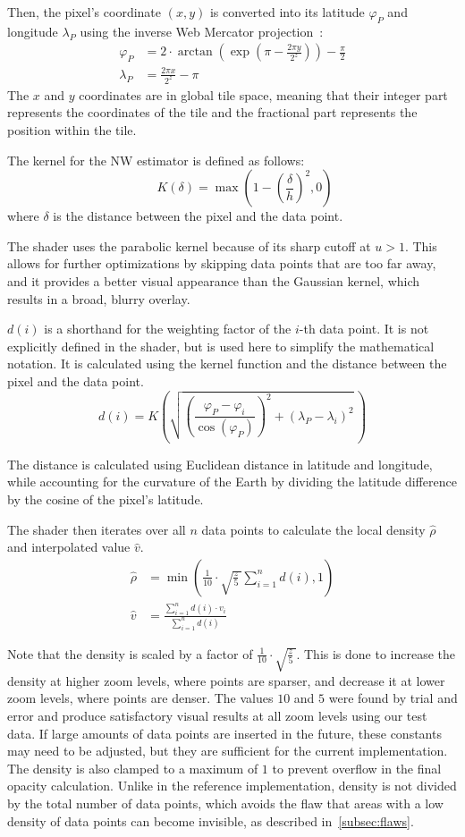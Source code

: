 Then, the pixel's coordinate $(x, y)$ is converted into its latitude $\varphi_{P}$ and longitude $\lambda_{P}$ using the inverse Web Mercator projection\ \cite{explorers:webmerc}:
\[
\begin{aligned}
\varphi_P &= 2 \cdot \arctan\left(\exp\left(\pi - \frac{2\pi y}{2^z}\right)\right) - \frac{\pi}{2}\\
\lambda_P &= \frac{2\pi x}{2^z} - \pi 
\end{aligned}
\]
The $x$ and $y$ coordinates are in global tile space, meaning that their integer part represents the coordinates of the tile and the fractional part represents the position within the tile.

The kernel for the NW estimator is defined as follows:
\[
\qquad K(\delta) = \max\left( 1-{\left( \frac{\delta}{h} \right)}^{2}, 0\right)
\]
where $\delta$ is the distance between the pixel and the data point.

The shader uses the parabolic kernel because of its sharp cutoff at $u > 1$. This allows for further optimizations by skipping data points that are too far away, and it provides a better visual appearance than the Gaussian kernel, which results in a broad, blurry overlay.

$d(i)$ is a shorthand for the weighting factor of the $i$-th data point. It is not explicitly defined in the shader, but is used here to simplify the mathematical notation. It is calculated using the kernel function and the distance between the pixel and the data point.
\[
d(i) = K\left(\sqrt{ {\left( \frac{\varphi_{P}-\varphi_{i}}{\cos(\varphi_{P})} \right)}^{2} + {(\lambda_{P}-\lambda_{i})}^{2}}\,\right)
\]

The distance is calculated using Euclidean distance in latitude and longitude, while accounting for the curvature of the Earth by dividing the latitude difference by the cosine of the pixel's latitude.

The shader then iterates over all $n$ data points to calculate the local density $\hat{\rho}$ and interpolated value $\hat{v}$.
\[
\begin{aligned}
\hat{\rho} &= \min\left(\frac{1}{10}\cdot\sqrt{ \frac{z}{5} \,}\sum_{i=1}^n d(i),1\right)\\
\hat{v} &= \frac{\sum_{i=1}^n d(i)\cdot v_{i}}{\sum_{i=1}^n d(i)}
\end{aligned}
\]

Note that the density is scaled by a factor of $\frac{1}{10}\cdot\sqrt{ \frac{z}{5} \,}$. This is done to increase the density at higher zoom levels, where points are sparser, and decrease it at lower zoom levels, where points are denser. The values $10$ and $5$ were found by trial and error and produce satisfactory visual results at all zoom levels using our test data. If large amounts of data points are inserted in the future, these constants may need to be adjusted, but they are sufficient for the current implementation. The density is also clamped to a maximum of $1$ to prevent overflow in the final opacity calculation. Unlike in the reference implementation, density is not divided by the total number of data points, which avoids the flaw that areas with a low density of data points can become invisible, as described in\ \autoref{subsec:flaws}.

